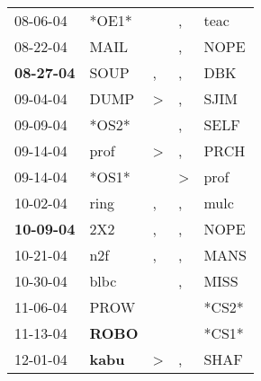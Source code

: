 \begin{supertabular}{p{0.07\textwidth}p{0.06\textwidth}p{0.02\textwidth}p{0.02\textwidth}p{0.06\textwidth}}
          08-06-04\textsuperscript{} &                            *OE1* &                  &                , &           teac\textsuperscript{} \\
          08-22-04\textsuperscript{} &           MAIL\textsuperscript{} &                  &                , &           NOPE\textsuperscript{} \\
 \textbf{08-27-04\textsuperscript{}} &           SOUP\textsuperscript{} &                , &                , &            DBK\textsuperscript{} \\
          09-04-04\textsuperscript{} &           DUMP\textsuperscript{} &     \textgreater &                , &           SJIM\textsuperscript{} \\
          09-09-04\textsuperscript{} &                            *OS2* &                  &                , &           SELF\textsuperscript{} \\
          09-14-04\textsuperscript{} &           prof\textsuperscript{} &     \textgreater &                , &           PRCH\textsuperscript{} \\
          09-14-04\textsuperscript{} &                            *OS1* &                  &     \textgreater &           prof\textsuperscript{} \\
          10-02-04\textsuperscript{} &           ring\textsuperscript{} &                , &                , &           mulc\textsuperscript{} \\
 \textbf{10-09-04\textsuperscript{}} &            2X2\textsuperscript{} &                , &                , &           NOPE\textsuperscript{} \\
          10-21-04\textsuperscript{} &            n2f\textsuperscript{} &                , &                , &           MANS\textsuperscript{} \\
          10-30-04\textsuperscript{} &           blbc\textsuperscript{} &                  &                , &           MISS\textsuperscript{} \\
          11-06-04\textsuperscript{} &           PROW\textsuperscript{} &                  &                  &                            *CS2* \\
          11-13-04\textsuperscript{} &  \textbf{ROBO\textsuperscript{}} &                  &                  &                            *CS1* \\
          12-01-04\textsuperscript{} &  \textbf{kabu\textsuperscript{}} &     \textgreater &                , &           SHAF\textsuperscript{} \\

\end{supertabular}
